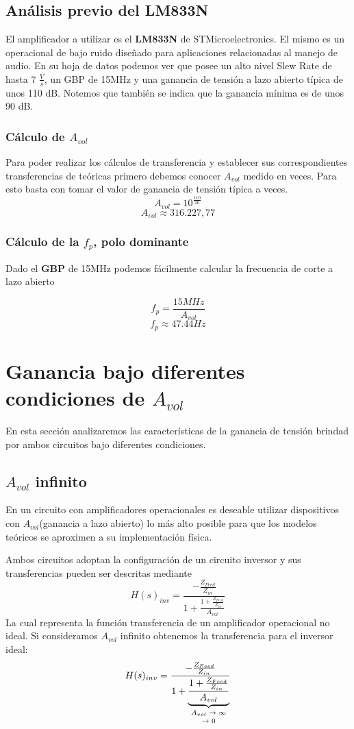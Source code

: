 \subsection{Análisis previo del \textbf{LM833N}}
El amplificador a utilizar es el \textbf{LM833N} de STMicroelectronics. El mismo es un operacional de bajo ruido diseñado para aplicaciones relacionadas al manejo de audio.
En su hoja de datos podemos ver que posee un alto nivel Slew Rate de hasta 7 $\frac{V}{s}$, un GBP de 15MHz y una ganancia de tensión 
a lazo abierto típica de unos 110 dB. Notemos que también se indica que la ganancia mínima es de unos 90 dB. 


 \subsubsection{Cálculo de $A_{vol}$}
Para poder realizar los cálculos de transferencia y establecer sus correspondientes transferencias de teóricas primero debemos conocer $A_{vol}$ medido en veces. Para esto basta con tomar el valor de ganancia de tensión típica a veces.
$$A_{vol} = 10^{\frac{110}{20}}$$
$$A_{vol} \approx 316.227,77$$

\subsubsection{Cálculo de  la $f_p$, polo dominante}

Dado el \textbf{GBP} de 15MHz podemos fácilmente calcular la frecuencia de corte a lazo abierto

$$ f_p = \frac{15MHz}{A_{vol}} $$
$$ f_p \approx 47.44Hz$$

\section{Ganancia bajo diferentes condiciones de $A_{vol}$}
En esta sección analizaremos las características de la ganancia de tensión brindad por ambos circuitos bajo diferentes condiciones.

\subsection{$A_{vol}$ infinito}
En un circuito con amplificadores operacionales es deseable utilizar dispositivos con $A_{vol}$(ganancia a lazo abierto) lo más alto posible para que los modelos teóricos se aproximen a su implementación física.

Ambos circuitos adoptan la configuración de un circuito inversor y sus transferencias pueden ser descritas mediante
$$H(s)_{inv} = \frac{-\frac{Z_{Feed}}{Z_{in}}}
{1+\frac{1+\frac{Z_{Feed}}{Z_{in}}}{A_{vol}}} $$
La cual representa la función transferencia de un amplificador operacional no ideal.
Si consideramos $A_{vol}$ infinito obtenemos la transferencia para el inversor ideal:
$$H(s)_{inv} = \frac{-\frac{Z_{Feed}}{Z_{in}}}
				{1+\underbrace{\frac{1+\frac{Z_{Feed}}{Z_{in}}}{A_{vol}}}_{\text{\shortstack{$A_{vol}\rightarrow \infty$ \\ $\rightarrow 0$}}}}$$


